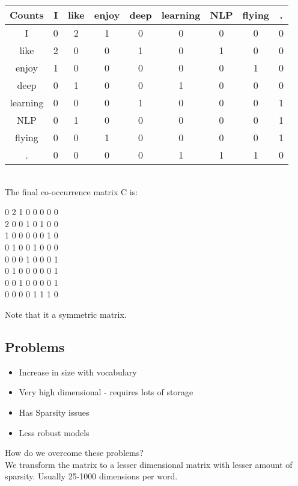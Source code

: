 \documentclass{article}
\begin{document}
\begin{tabular}{|c|c|c|c|c|c|c|c|c|}
    \hline
    Counts& I  & like & enjoy &  deep& learning & NLP & flying & . \\\hline
    I	    &0&2&1&0&0&0&0&0\\\hline 
    like    &2&0&0&1&0&1&0&0\\\hline
    enjoy   &1&0&0&0&0&0&1&0\\\hline
    deep    &0&1&0&0&1&0&0&0\\\hline
    learning&0&0&0&1&0&0&0&1\\\hline
    NLP     &0&1&0&0&0&0&0&1\\\hline
    flying  &0&0&1&0&0&0&0&1\\\hline
    .       &0&0&0&0&1&1&1&0\\\hline
\end{tabular}
\vspace{10pt}\\
The final co-occurrence matrix C is:
\begin{center} 
0 2 1 0 0 0 0 0\\
2 0 0 1 0 1 0 0\\
1 0 0 0 0 0 1 0\\
0 1 0 0 1 0 0 0\\
0 0 0 1 0 0 0 1\\
0 1 0 0 0 0 0 1\\
0 0 1 0 0 0 0 1\\
0 0 0 0 1 1 1 0\\
\end{center}

Note that it a symmetric matrix.

\subsection{Problems}
\begin{itemize} 
\item Increase in size with vocabulary
\item Very high dimensional - requires lots of storage
\item Has Sparsity issues
\item Less robust models
\end{itemize}

How do we overcome these problems?\\

We transform the matrix to a lesser dimensional matrix with lesser amount of sparsity. Usually 25-1000 dimensions per word. 
\end{document}
